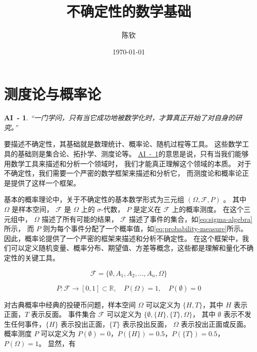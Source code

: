 \documentclass[a4paper]{ctexart}
\title{不确定性的数学基础}
\author{陈钦}
\date{\today}
\newtheorem{AI}{AI~-}
\newcommand{\airef}[1]{\hyperref[#1]{AI~-~\ref*{#1}}}
\begin{document}
\maketitle

\section{测度论与概率论}

\begin{AI}
    \label{AI:math-mathematization}
    “一门学问，只有当它成功地被数学化时，才算真正开始了对自身的研究。”
\end{AI}

要描述不确定性，其基础就是数理统计、概率论、随机过程等工具。
这些数学工具的基础则是集合论、拓扑学、测度论等。
\airef{AI:math-mathematization}的意思是说，只有当我们能够用数学工具来描述和分析一个领域时，
我们才能真正理解这个领域的本质。
对于不确定性，我们需要一个严密的数学框架来描述和分析它，
而测度论和概率论正是提供了这样一个框架。

基本的概率理论中，关于不确定性的基本数学形式为三元组 $(\Omega, \mathcal{F}, P)$ 。
其中 $\Omega$ 是样本空间，
$\mathcal{F}$ 是 $\Omega$ 上的 $\sigma$-代数，
$P$ 是定义在 $\mathcal{F}$ 上的概率测度。
在这个三元组中，
$\Omega$ 描述了所有可能的结果，
$\mathcal{F}$ 描述了事件的集合，如\eqref{eq:sigma-algebra}所示，
而 $P$ 则为每个事件分配了一个概率值，如\eqref{eq:probability-measure}所示。
因此，概率论提供了一个严密的框架来描述和分析不确定性。
在这个框架中，我们可以定义随机变量、概率分布、期望值、方差等概念，这些都是理解和量化不确定性的关键工具。

\begin{equation}
    \mathcal{F} = \{
    \emptyset,  A_1, A_2, \ldots,  A_n, \Omega
    \}
    \label{eq:sigma-algebra}
\end{equation}

\begin{equation}
    P: \mathcal{F} \to [0, 1] \subset \mathbb{R}, \quad P(\Omega) = 1, \quad P(\emptyset) = 0
    \label{eq:probability-measure}
\end{equation}

对古典概率中经典的投硬币问题，样本空间 $\Omega$ 可以定义为 $\{H, T\}$，其中 $H$ 表示正面，$T$ 表示反面。
事件集合 $\mathcal{F}$ 可以定义为 $\{\emptyset, \{H\}, \{T\}, \Omega\}$，
其中 $\emptyset$ 表示不发生任何事件，$\{H\}$ 表示投出正面，$\{T\}$ 表示投出反面，
$\Omega$ 表示投出正面或反面。
概率测度 $P$ 可以定义为 $P(\emptyset) = 0$，$P(\{H\}) = 0.5$，$P(\{T\}) = 0.5$，$P(\Omega) = 1$。
显然，有
\end{document}
